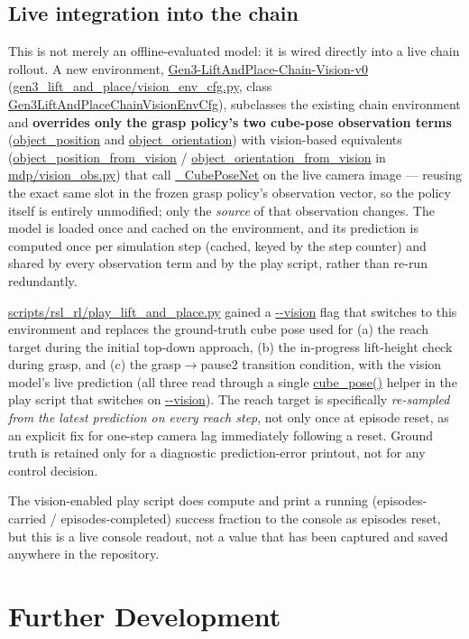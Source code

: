 \documentclass[11pt]{article}
\begin{document}
\subsection{Live integration into the chain}

This is not merely an offline-evaluated model: it is wired directly into a live
chain rollout. A new environment,
\url{Gen3-LiftAndPlace-Chain-Vision-v0}
(\url{gen3_lift_and_place/vision_env_cfg.py}, class
\url{Gen3LiftAndPlaceChainVisionEnvCfg}), subclasses the existing chain
environment and \textbf{overrides only the grasp policy's two cube-pose
observation terms} (\url{object_position} and \url{object_orientation})
with vision-based equivalents (\url{object_position_from_vision} /
\url{object_orientation_from_vision} in \url{mdp/vision_obs.py}) that call
\url{_CubePoseNet} on the live camera image --- reusing the exact same slot in the frozen grasp policy's observation
vector, so the policy itself is entirely unmodified; only the \emph{source} of
that observation changes. The model is loaded once and cached on the environment,
and its prediction is computed once per simulation step (cached, keyed by the
step counter) and shared by every
observation term and by the play script, rather than re-run redundantly.

\url{scripts/rsl_rl/play_lift_and_place.py} gained a \url{--vision} flag that switches to
this environment and replaces the ground-truth cube pose used for (a) the reach
target during the initial top-down approach, (b) the in-progress lift-height check
during grasp, and (c) the grasp$\to$pause2 transition condition, with the vision
model's live prediction (all three read through a single \url{cube_pose()}
helper in the play script that switches on \url{--vision}). The reach target is specifically \emph{re-sampled from
the latest prediction on every reach step}, not only once at episode reset, as an
explicit fix for one-step camera lag immediately following a reset. Ground truth is
retained only for a diagnostic prediction-error printout, not for any control
decision.

The vision-enabled play script does compute and print a running
(episodes-carried / episodes-completed) success fraction to the console as
episodes reset, but this is a live console readout, not a value that has been
captured and saved anywhere in the repository.

\section{Further Development}
\label{sec:further}
\end{document}
